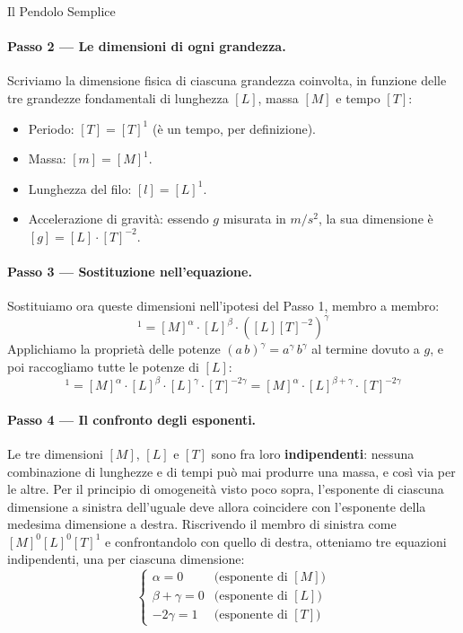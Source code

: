 \begin{esercizio}{Il Pendolo Semplice}
\paragraph{Passo 2 --- Le dimensioni di ogni grandezza.}
Scriviamo la dimensione fisica di ciascuna grandezza coinvolta, in funzione delle tre grandezze fondamentali di lunghezza $[L]$, massa $[M]$ e tempo $[T]$:
\begin{itemize}
    \item Periodo: $[T] = [T]^1$ (è un tempo, per definizione).
    \item Massa: $[m] = [M]^1$.
    \item Lunghezza del filo: $[l] = [L]^1$.
    \item Accelerazione di gravità: essendo $g$ misurata in $m/s^2$, la sua dimensione è $[g] = [L] \cdot [T]^{-2}$.
\end{itemize}

\paragraph{Passo 3 --- Sostituzione nell'equazione.}
Sostituiamo ora queste dimensioni nell'ipotesi del Passo 1, membro a membro:
\begin{equation}
    [T]^1 = [M]^\alpha \cdot [L]^\beta \cdot \left([L][T]^{-2}\right)^\gamma
\end{equation}
Applichiamo la proprietà delle potenze $(a\,b)^\gamma = a^\gamma \, b^\gamma$ al termine dovuto a $g$, e poi raccogliamo tutte le potenze di $[L]$:
\begin{equation}
    [T]^1 = [M]^\alpha \cdot [L]^\beta \cdot [L]^\gamma \cdot [T]^{-2\gamma}
         = [M]^\alpha \cdot [L]^{\beta+\gamma} \cdot [T]^{-2\gamma}
\end{equation}

\paragraph{Passo 4 --- Il confronto degli esponenti.}
Le tre dimensioni $[M]$, $[L]$ e $[T]$ sono fra loro \textbf{indipendenti}: nessuna combinazione di lunghezze e di tempi può mai produrre una massa, e così via per le altre. Per il principio di omogeneità visto poco sopra, l'esponente di ciascuna dimensione a sinistra dell'uguale deve allora coincidere con l'esponente della medesima dimensione a destra. Riscrivendo il membro di sinistra come $[M]^0 [L]^0 [T]^1$ e confrontandolo con quello di destra, otteniamo tre equazioni indipendenti, una per ciascuna dimensione:
\begin{equation}
    \begin{cases}
    \alpha = 0 & \text{(esponente di } [M] \text{)} \\
    \beta + \gamma = 0 & \text{(esponente di } [L] \text{)} \\
    -2\gamma = 1 & \text{(esponente di } [T] \text{)}
\end{cases}
\end{equation}


\end{esercizio}
